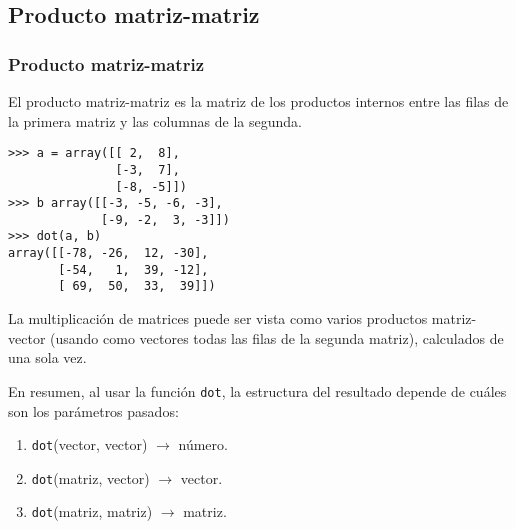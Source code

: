 \subsection{Producto matriz-matriz}
\begin{frame}[fragile]
\frametitle{Producto matriz-matriz}
\fontsize{12}{12}\selectfont
El producto matriz-matriz es la matriz de los productos internos entre las filas de la primera matriz y las columnas de la segunda.
\begin{exampleblock}{}
\verb|>>> a = array([[ 2,  8],| \\
\verb|               [-3,  7],| \\
\verb|               [-8, -5]])| \\
\verb|>>> b array([[-3, -5, -6, -3],| \\
\verb|             [-9, -2,  3, -3]])| \\
\pause
\verb|>>> dot(a, b)| \\
\pause
\verb|array([[-78, -26,  12, -30],|\\
\verb|       [-54,   1,  39, -12],| \\
\verb|       [ 69,  50,  33,  39]])| \\
\end{exampleblock}
\end{frame}
\begin{frame}
La multiplicación de matrices puede ser vista como varios productos matriz-vector (usando como vectores todas las filas de la segunda matriz), calculados de una sola vez.
\end{frame}
\begin{frame}
En resumen, al usar la función \texttt{dot}, la estructura del resultado depende de cuáles son los parámetros pasados:
\begin{enumerate}[<+->]
\item \texttt{dot}(vector, vector) $\rightarrow$ número.
\item \texttt{dot}(matriz, vector) $\rightarrow$ vector.
\item \texttt{dot}(matriz, matriz) $\rightarrow$ matriz.
\end{enumerate}
\end{frame}
